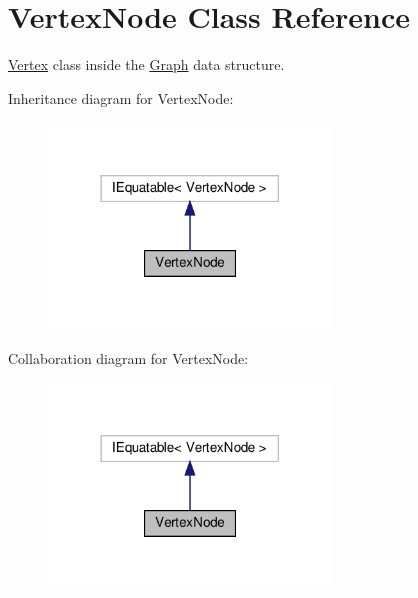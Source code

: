 \hypertarget{classVertexNode}{}\section{Vertex\+Node Class Reference}
\label{classVertexNode}


\hyperlink{structVertex}{Vertex} class inside the \hyperlink{classGraph}{Graph} data structure.  




Inheritance diagram for Vertex\+Node\+:\nopagebreak
\begin{figure}[H]
\begin{center}
\leavevmode
\includegraphics[width=213pt]{classVertexNode__inherit__graph}
\end{center}
\end{figure}


Collaboration diagram for Vertex\+Node\+:\nopagebreak
\begin{figure}[H]
\begin{center}
\leavevmode
\includegraphics[width=213pt]{classVertexNode__coll__graph}
\end{center}
\end{figure}
